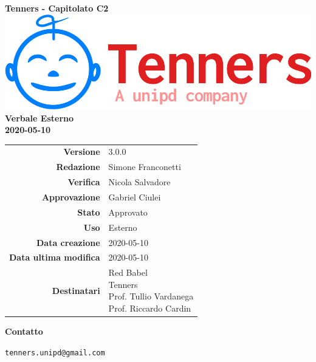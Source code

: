 \begin{titlepage}
	\begin{center}
		\large \textbf{Tenners - Capitolato C2}
		\vfill
		\includegraphics[scale = 0.3]{./res/img/logo.png}\\
		\vfill
		\Huge \textbf{Verbale Esterno} \\
		\textbf {2020-05-10}

        \vfill
        \large

        \begin{tabular}{r|l}
        	\textbf{Versione} & 3.0.0 \\
        	\textbf{Redazione} & Simone Franconetti \\
        	\textbf{Verifica} &  Nicola Salvadore \\
        	\textbf{Approvazione} & Gabriel Ciulei \\
        	\textbf{Stato} & Approvato \\
        	\textbf{Uso} &  Esterno\\
        	\textbf{Data creazione} &  2020-05-10\\
        	\textbf{Data ultima modifica} & 2020-05-10 \\
        	\textbf{Destinatari} & \parbox[t]{5cm}{Red Babel\\Tenners \\ Prof. Tullio Vardanega\\ Prof. Riccardo Cardin}
        \end{tabular}
    	\vfill
    	\normalsize
    	\vfill
    	\textbf{Contatto}

    	\texttt{tenners.unipd@gmail.com}

	\end{center}
\end{titlepage}
